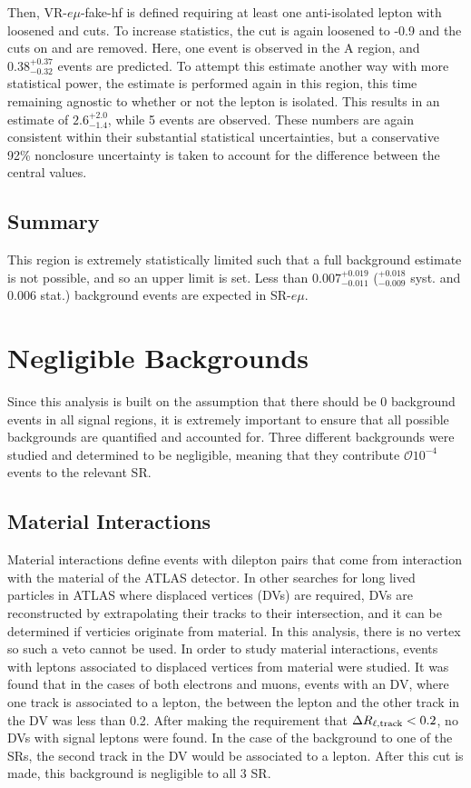 Then, VR-$e\mu$-fake-hf is defined requiring at least one anti-isolated lepton with loosened \pt and \absdz cuts. To increase statistics, the \dpt cut is again loosened to -0.9 and the cuts on \nprecision and \nphi are removed. Here, one event is observed in the A region, and $0.38^{+0.37}_{-0.32}$ events are predicted. To attempt this estimate another way with more statistical power, the estimate is performed again in this region, this time remaining agnostic to whether or not the lepton is isolated. This results in an estimate of $2.6^{+2.0}_{-1.4}$, while 5 events are observed. These numbers are again consistent within their substantial statistical uncertainties, but a conservative 92\% nonclosure uncertainty is taken to account for the difference between the central values.

\subsection{Summary}
This region is extremely statistically limited such that a full background estimate is not possible, and so an upper limit is set. Less than 
$0.007^{+0.019}_{-0.011}$ ($^{+0.018}_{-0.009}$ syst. and 0.006 stat.) background events are expected in SR-$e\mu$.
 
\section{Negligible Backgrounds}
Since this analysis is built on the assumption that there should be 0 background events in all signal regions, it is extremely important to ensure that all possible backgrounds are quantified and accounted for. Three different backgrounds were studied and determined to be negligible, meaning that they contribute $\mathcal{O}10^{-4}$ events to the relevant \ac{SR}. 

\subsection{Material Interactions}

Material interactions define events with dilepton pairs that come from interaction with the material of the \ac{ATLAS} detector. In other searches for long lived particles in \ac{ATLAS} where displaced vertices (\acp{DV}) are required, \ac{DV}s are reconstructed by extrapolating their tracks to their intersection, and it can be determined if verticies originate from material. In this analysis, there is no vertex so such a veto cannot be used. In order to study material interactions, events with leptons associated to displaced vertices from material were studied. It was found that in the cases of both electrons and muons, events with an \ac{DV}, where one track is associated to a lepton, the \dR between the lepton and the other track in the \ac{DV} was less than 0.2. After making the requirement that $\Delta R_{\ell, \text{track}} < 0.2$, no \acp{DV} with signal leptons were found. In the case of the background to one of the \acp{SR}, the second track in the \ac{DV} would be associated to a lepton. After this cut is made, this background is negligible to all 3 \ac{SR}.

